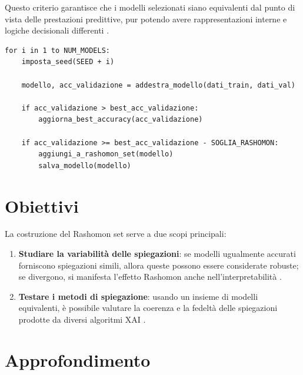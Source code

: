 \documentclass[12pt,a4paper,oneside]{report}
\numberwithin{figure}{chapter}
\numberwithin{table}{chapter}
\begin{document}
Questo criterio garantisce che i modelli selezionati siano equivalenti dal
punto di vista delle prestazioni predittive, pur potendo avere rappresentazioni
interne e logiche decisionali differenti
\citep{leventi2023consistency,mueller2023rashomon}.

\begin{lstlisting}[caption={Addestramento modelli e selezione Rashomon set}, label={lst:rashomon_training}]
for i in 1 to NUM_MODELS:
    imposta_seed(SEED + i)
    
    modello, acc_validazione = addestra_modello(dati_train, dati_val)
    
    if acc_validazione > best_acc_validazione:
        aggiorna_best_accuracy(acc_validazione)

    if acc_validazione >= best_acc_validazione - SOGLIA_RASHOMON:
        aggiungi_a_rashomon_set(modello)
        salva_modello(modello)
\end{lstlisting}

\section{Obiettivi}
La costruzione del Rashomon set serve a due scopi principali:
\begin{enumerate}
      \item \textbf{Studiare la variabilità delle spiegazioni}: se modelli ugualmente accurati forniscono spiegazioni simili, allora queste possono essere considerate robuste; se divergono, si manifesta l’effetto Rashomon anche nell’interpretabilità \citep{mueller2023rashomon}.
      \item \textbf{Testare i metodi di spiegazione}: usando un insieme di modelli equivalenti, è possibile valutare la coerenza e la fedeltà delle spiegazioni prodotte da diversi algoritmi XAI \citep{leventi2023consistency}.
\end{enumerate}

\section{Approfondimento}
\end{document}
